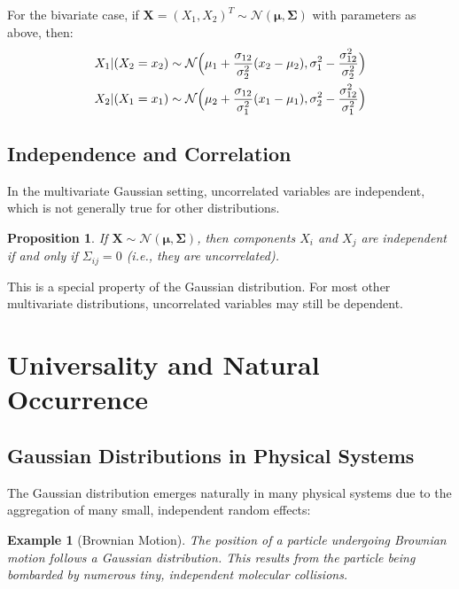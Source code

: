 \documentclass{article}
\newtheorem{proposition}[theorem]{Proposition}
\newtheorem{example}{Example}
\begin{document}
For the bivariate case, if $\mathbf{X} = (X_1, X_2)^T \sim \mathcal{N}(\boldsymbol{\mu}, \boldsymbol{\Sigma})$ with parameters as above, then:
\begin{align*}
X_1 | (X_2 = x_2) &\sim \mathcal{N}\Bigl(\mu_1 + \frac{\sigma_{12}}{\sigma_2^2}(x_2 - \mu_2), \sigma_1^2 - \frac{\sigma_{12}^2}{\sigma_2^2}\Bigr) \\
X_2 | (X_1 = x_1) &\sim \mathcal{N}\Bigl(\mu_2 + \frac{\sigma_{12}}{\sigma_1^2}(x_1 - \mu_1), \sigma_2^2 - \frac{\sigma_{12}^2}{\sigma_1^2}\Bigr)
\end{align*}

\subsection{Independence and Correlation}

In the multivariate Gaussian setting, uncorrelated variables are independent, which is not generally true for other distributions.

\begin{proposition}
If $\mathbf{X} \sim \mathcal{N}(\boldsymbol{\mu}, \boldsymbol{\Sigma})$, then components $X_i$ and $X_j$ are independent if and only if $\Sigma_{ij} = 0$ (i.e., they are uncorrelated).
\end{proposition}

This is a special property of the Gaussian distribution. For most other multivariate distributions, uncorrelated variables may still be dependent.

\section{Universality and Natural Occurrence}

\subsection{Gaussian Distributions in Physical Systems}

The Gaussian distribution emerges naturally in many physical systems due to the aggregation of many small, independent random effects:

\begin{example}[Brownian Motion]
The position of a particle undergoing Brownian motion follows a Gaussian distribution. This results from the particle being bombarded by numerous tiny, independent molecular collisions.
\end{example}
\end{document}
